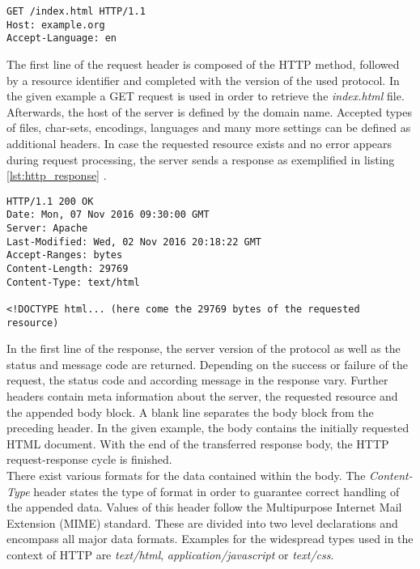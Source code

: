 \begin{lstlisting}[caption={Example for HTTP GET request}, label={lst:http_request_example}]
GET /index.html HTTP/1.1
Host: example.org
Accept-Language: en
\end{lstlisting}

The first line of the request header is composed of the HTTP method, followed by a resource identifier and completed with the version of the used protocol. In the given example a GET request is used in order to retrieve the \emph{index.html} file. Afterwards, the host of the server is defined by the domain name. Accepted types of files, char-sets, encodings, languages and many more settings can be defined as additional headers. In case the requested resource exists and no error appears during request processing, the server sends a response as exemplified in listing \ref{lst:http_response} \cite{MDN:2016}. \\

\begin{lstlisting}[caption={Example for HTTP GET response}, label={lst:http_response}]
HTTP/1.1 200 OK
Date: Mon, 07 Nov 2016 09:30:00 GMT
Server: Apache
Last-Modified: Wed, 02 Nov 2016 20:18:22 GMT
Accept-Ranges: bytes
Content-Length: 29769
Content-Type: text/html

<!DOCTYPE html... (here come the 29769 bytes of the requested resource)
\end{lstlisting}

In the first line of the response, the server version of the protocol as well as the status and message code are returned. Depending on the success or failure of the request, the status code and according message in the response vary. Further headers contain meta information about the server, the requested resource and the appended body block. A blank line separates the body block from the preceding header. In the given example, the body contains the initially requested HTML document. With the end of the transferred response body, the HTTP request-response cycle is finished. \\

There exist various formats for the data contained within the body. The \emph{Content-Type} header states the type of format in order to guarantee correct handling of the appended data. Values of this header follow the Multipurpose Internet Mail Extension (MIME) standard. These are divided into two level declarations and encompass all major data formats. Examples for the widespread types used in the context of HTTP are \emph{text/html}, \emph{application/javascript} or \emph{text/css}.

